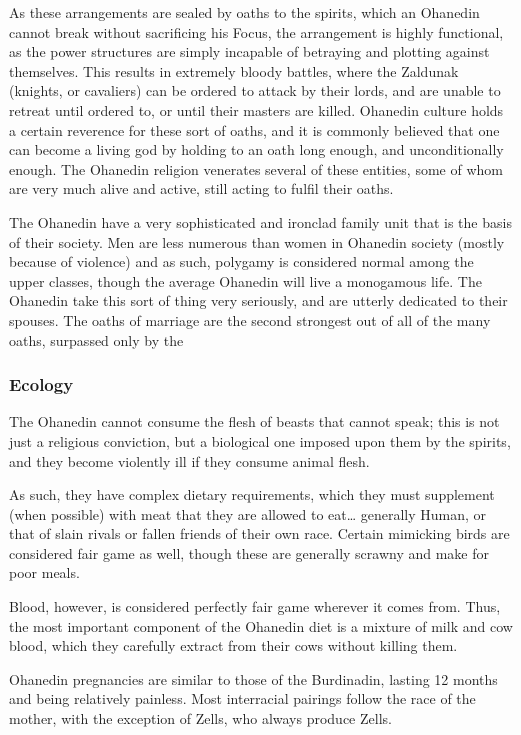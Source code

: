 \documentclass[oneside,11pt,english]{book}
\begin{document}
As these arrangements are sealed by oaths to the spirits, which an Ohanedin cannot break without 
sacrificing his Focus, the arrangement is highly functional, as the power structures are simply incapable 
of betraying and plotting against themselves. This results in extremely bloody battles, where the Zaldunak 
(knights, or cavaliers) can be ordered to attack by their lords, and are unable to retreat until ordered to, or 
until their masters are killed. Ohanedin culture holds a certain reverence for these sort of oaths, and it is 
commonly believed that one can become a living god by holding to an oath long enough, and 
unconditionally enough. The Ohanedin religion venerates several of these entities, some of whom are 
very much alive and active, still acting to fulfil their oaths. 


The Ohanedin have a very sophisticated and ironclad family unit that is the basis of their society. Men are 
less numerous than women in Ohanedin society (mostly because of violence) and as such, polygamy is 
considered normal among the upper classes, though the average Ohanedin will live a monogamous life. 
The Ohanedin take this sort of thing very seriously, and are utterly dedicated to their spouses. The oaths 
of marriage are the second strongest out of all of the many oaths, surpassed only by the 


\subsubsection*{Ecology} 
The Ohanedin cannot consume the flesh of beasts that cannot speak; this is not just a religious conviction, 
but a biological one imposed upon them by the spirits, and they become violently ill if they consume animal flesh. 


As such, they have complex dietary requirements, which they must supplement (when possible) with meat 
that they are allowed to eat… generally Human, or that of slain rivals or fallen friends of their own race. 
Certain mimicking birds are considered fair game as well, though these are generally scrawny and make 
for poor meals. 


Blood, however, is considered perfectly fair game wherever it comes from. Thus, the most important component of the Ohanedin diet is a mixture of milk and cow blood, which they carefully extract from 
their cows without killing them. 


Ohanedin pregnancies are similar to those of the Burdinadin, lasting 12 months and being relatively 
painless. Most interracial pairings follow the race of the mother, with the exception of Zells, who always 
produce Zells. 
\end{document}
